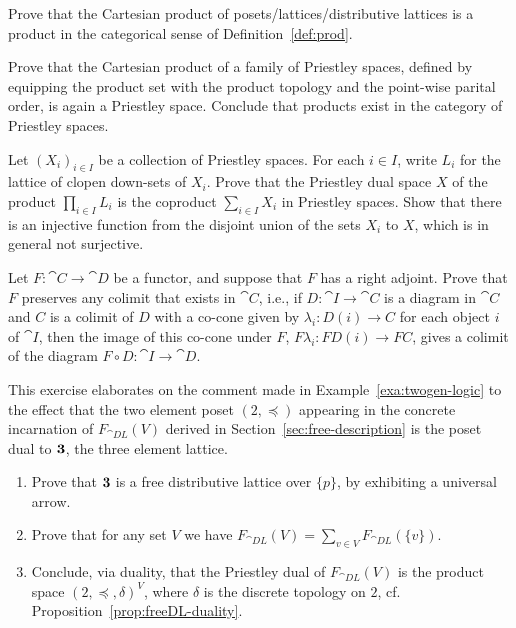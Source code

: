 \exercise\label{exe:cart-product-cat}
Prove that the Cartesian product of posets/lattices/distributive lattices is a product in the categorical sense of Definition~\ref{def:prod}.

\exercise\label{exe:Priestley-product}
Prove that the Cartesian product of a family of Priestley spaces, defined by equipping the product set with the product topology and the point-wise parital order, is again a Priestley space. Conclude that products exist in the category of Priestley spaces.

\begin{exercise}\label{exe:priestley-coproduct}
Let $(X_i)_{i \in I}$ be a collection of Priestley spaces. For each $i \in I$, write $L_i$ for the lattice of clopen down-sets of $X_i$. Prove that the Priestley dual space $X$ of the product $\prod_{i \in I} L_i$ is the coproduct $\sum_{i \in I} X_i$ in Priestley spaces. Show that there is an injective function from the disjoint union of the sets $X_i$ to $X$, which is in general not surjective.
\end{exercise}
\begin{exercise}\label{exe:left-ad-pres-colimits}
Let $F \colon \cat{C} \to \cat{D}$ be a functor, and suppose that $F$ has a right adjoint. Prove that $F$ preserves any colimit that exists in $\cat{C}$, i.e., if $D \colon \cat{I} \to \cat{C}$ is a diagram in $\cat{C}$ and $C$ is a colimit of $D$ with a co-cone given by $\lambda_i \colon D(i) \to C$ for each object $i$ of $\cat{I}$, then the image of this co-cone under $F$, $F\lambda_i \colon FD(i) \to FC$, gives a colimit of the diagram $F \circ D \colon \cat{I} \to \cat{D}$. 
\end{exercise}
\begin{exercise}\label{exe:freeiscoproduct}
  This exercise elaborates on the comment made in Example~\ref{exa:twogen-logic} to the effect that the two element poset $(2,\preceq)$ appearing in the concrete incarnation of $F_{\cat{DL}}(V)$ derived in Section~\ref{sec:free-description} is the poset dual to $\bf 3$, the three element lattice.
  \begin{enumerate}
  \item Prove that $\bf 3$ is a free distributive lattice over $\{p\}$, by exhibiting a universal arrow.
  \item Prove that for any set $V$ we have $F_{\cat{DL}}(V)=\sum_{v\in V} F_{\cat{DL}}(\{v\})$.
  \item Conclude, via duality, that the Priestley dual of $F_{\cat{DL}}(V)$ is the product space $(2,\preceq,\delta)^V$, where $\delta$ is the discrete topology on $2$, cf. Proposition~\ref{prop:freeDL-duality}.
    \end{enumerate}
  \end{exercise}

